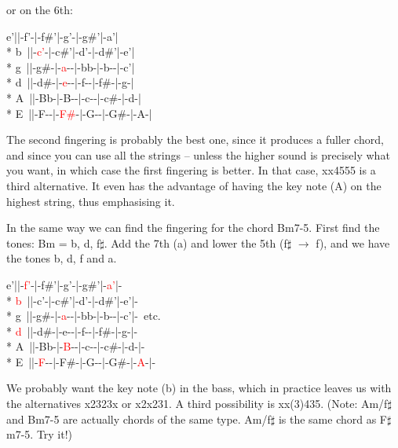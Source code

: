 \begin{articlelayout}
or on the 6th: %
\begin{pre}
\begin{adjustwidth}{2em}{0em}
e'||-f'-|-f\#'|-g'-|-g\#'|-a'|\\*
b~||-\textcolor{red}{c'}-|-c\#'|-d'-|-d\#'|-e'|\\*
g~||-g\#-|-\textcolor{red}{a}-{}-|-bb-|-b-{}-|-c'|\\*
d~||-d\#-|-\textcolor{red}{e}-{}-|-f-{}-|-f\#-|-g-|\\*
A~||-Bb-|-B-{}-|-c-{}-|-c\#-|-d-|\\*
E~||-F-{}-|-\textcolor{red}{F\#}-|-G-{}-|-G\#-|-A-|
\end{adjustwidth}
\end{pre}

The second fingering is probably the best one, since it produces a
fuller chord, and since you can use all the strings -- unless the higher sound is precisely what you
want, in which case the first fingering is
better. In that case, xx4555 is a third alternative. It even has the
advantage of having the key note (A) on the highest string, thus
emphasising it.

In the same way we can find the fingering for the chord Bm7-5. First
find the tones: Bm = b, d, f$\sharp$. Add the 7th (a) and lower the
5th (f$\sharp$ $\to$ f), and we have the tones b, d, f and a.

\begin{pre}
\begin{adjustwidth}{2em}{0em}
e'||-\textcolor{red}{f'}-|-f\#'|-g'-|-g\#'|-\textcolor{red}{a'}|-\\*
\textcolor{red}{b}~||-c'-|-c\#'|-d'-|-d\#'|-e'|-\\*
g~||-g\#-|-\textcolor{red}{a}-{}-|-bb-|-b-{}-|-c'|-~etc.\\*
\textcolor{red}{d}~||-d\#-|-e-{}-|-f-{}-|-f\#-|-g-|-\\*
A~||-Bb-|-\textcolor{red}{B}-{}-|-c-{}-|-c\#-|-d-|-\\*
E~||-\textcolor{red}{F}-{}-|-F\#-|-G-{}-|-G\#-|-\textcolor{red}{A}-|-
\end{adjustwidth}
\end{pre}

We probably want the key note (b) in the bass, which in practice
leaves us with the alternatives x2323x or x2x231. A third possibility is xx(3)435. (Note:
Am/f$\sharp$ and Bm7-5 are actually chords of the same
type. Am/f$\sharp$ is the same chord as F$\sharp$m7-5. Try it!)


\end{articlelayout}
